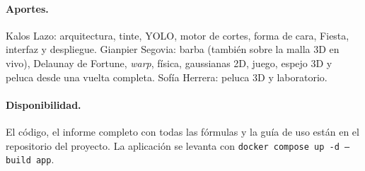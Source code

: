 \documentclass[10pt,a4paper,twocolumn]{article}
\begin{document}
\paragraph{Aportes.} Kalos Lazo: arquitectura, tinte, YOLO, motor de cortes, forma de cara, Fiesta, interfaz y despliegue. Gianpier Segovia: barba (también sobre la malla 3D en vivo), Delaunay de Fortune, \emph{warp}, física, gaussianas 2D, juego, espejo 3D y peluca desde una vuelta completa. Sofía Herrera: peluca 3D y laboratorio.

\paragraph{Disponibilidad.} El código, el informe completo con todas las fórmulas y la guía de uso están en el repositorio del proyecto. La aplicación se levanta con \texttt{docker compose up -d --build app}.

{\small


}
\end{document}
